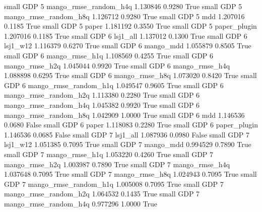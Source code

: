      small      GDP                 5 mango_rmse_random_h4q   1.130846      0.9280    True
     small      GDP                 5 mango_rmse_random_h8q   1.126712      0.9280    True
     small      GDP                 5                   mdd   1.207016      0.1185    True
     small      GDP                 5                 paper   1.181192      0.3550    True
     small      GDP                 5          paper_plugin   1.207016      0.1185    True
     small      GDP                 6              lsj1_all   1.137012      0.1300    True
     small      GDP                 6              lsj1_w12   1.116379      0.6270    True
     small      GDP                 6             mango_mdd   1.055879      0.8505    True
     small      GDP                 6        mango_rmse_h1q   1.108569      0.4255    True
     small      GDP                 6        mango_rmse_h2q   1.045044      0.9920    True
     small      GDP                 6        mango_rmse_h4q   1.088898      0.6295    True
     small      GDP                 6        mango_rmse_h8q   1.073020      0.8420    True
     small      GDP                 6 mango_rmse_random_h1q   1.049547      0.9605    True
     small      GDP                 6 mango_rmse_random_h2q   1.113380      0.2280    True
     small      GDP                 6 mango_rmse_random_h4q   1.045382      0.9920    True
     small      GDP                 6 mango_rmse_random_h8q   1.042909      1.0000    True
     small      GDP                 6                   mdd   1.146536      0.0680   False
     small      GDP                 6                 paper   1.118083      0.2280    True
     small      GDP                 6          paper_plugin   1.146536      0.0685   False
     small      GDP                 7              lsj1_all   1.087936      0.0980   False
     small      GDP                 7              lsj1_w12   1.051385      0.7095    True
     small      GDP                 7             mango_mdd   0.994529      0.7890    True
     small      GDP                 7        mango_rmse_h1q   1.053220      0.4260    True
     small      GDP                 7        mango_rmse_h2q   1.003987      0.7890    True
     small      GDP                 7        mango_rmse_h4q   1.037648      0.7095    True
     small      GDP                 7        mango_rmse_h8q   1.024943      0.7095    True
     small      GDP                 7 mango_rmse_random_h1q   1.005008      0.7095    True
     small      GDP                 7 mango_rmse_random_h2q   1.064532      0.1435    True
     small      GDP                 7 mango_rmse_random_h4q   0.977296      1.0000    True
